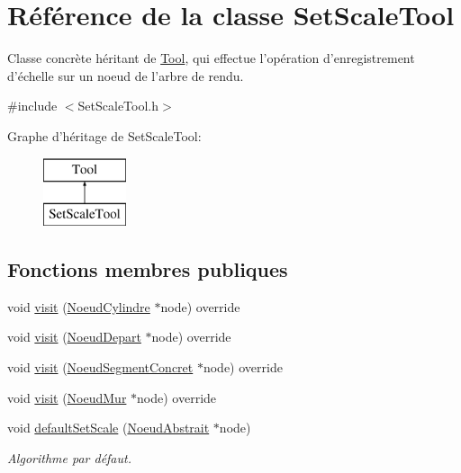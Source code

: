 \hypertarget{class_set_scale_tool}{\section{Référence de la classe Set\-Scale\-Tool}
\label{class_set_scale_tool}
}


Classe concrète héritant de \hyperlink{class_tool}{Tool}, qui effectue l'opération d'enregistrement d'échelle sur un noeud de l'arbre de rendu.  




{\ttfamily \#include $<$Set\-Scale\-Tool.\-h$>$}

Graphe d'héritage de Set\-Scale\-Tool\-:\begin{figure}[H]
\begin{center}
\leavevmode
\includegraphics[height=2.000000cm]{class_set_scale_tool}
\end{center}
\end{figure}
\subsection*{Fonctions membres publiques}
\begin{DoxyCompactItemize}
\item 
void \hyperlink{group__inf2990_gae12ec27e420078166d0f1fbce51ea3c1}{visit} (\hyperlink{class_noeud_cylindre}{Noeud\-Cylindre} $\ast$node) override
\item 
void \hyperlink{group__inf2990_ga372ff3eab42997c84eb768fdf72a5dcc}{visit} (\hyperlink{class_noeud_depart}{Noeud\-Depart} $\ast$node) override
\item 
void \hyperlink{group__inf2990_ga3f0a73ab0f183d9d4e3a6820442f17a2}{visit} (\hyperlink{class_noeud_segment_concret}{Noeud\-Segment\-Concret} $\ast$node) override
\item 
void \hyperlink{group__inf2990_ga51cfb7f08b02858b45b2beb9e51a8dce}{visit} (\hyperlink{class_noeud_mur}{Noeud\-Mur} $\ast$node) override
\item 
void \hyperlink{group__inf2990_ga589b51975cc03cea1752747ef558a45d}{default\-Set\-Scale} (\hyperlink{class_noeud_abstrait}{Noeud\-Abstrait} $\ast$node)
\begin{DoxyCompactList}\small\item\em Algorithme par défaut. \end{DoxyCompactList}\end{DoxyCompactItemize}


